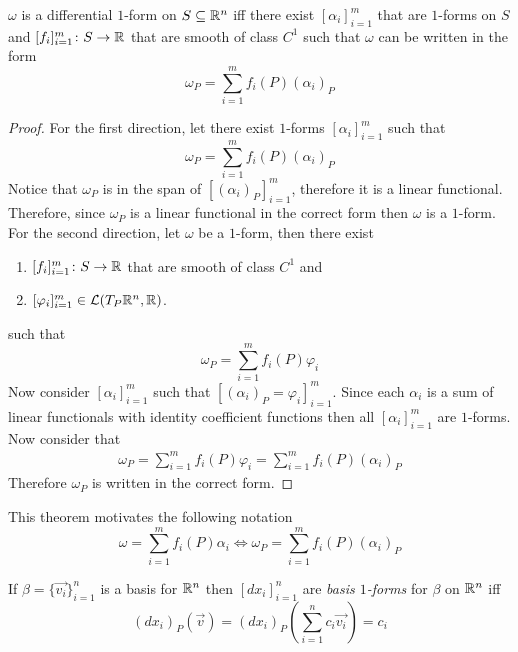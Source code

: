 \documentclass[notes]{subfiles}
\begin{document}
\begin{theorem} \label{forms_are_sum_of_forms}
    $\omega$ is a differential $1$-form on $S \subseteq \mathbb{R}^n$ iff there exist $[\alpha_i]_{i = 1}^m$ that are $1$-forms on $S$ and $[f_i]_{i = 1}^m\colon S \to \mathbb{R}$ that are smooth of class $C^1$ such that $\omega$ can be written in the form
    \[
        \omega_P = \sum_{i = 1}^m f_i(P)(\alpha_i)_P
    \]
\end{theorem}
\begin{proof}
    For the first direction, let there exist $1$-forms $[\alpha_i]_{i = 1}^m$ such that
    \[
        \omega_P = \sum_{i = 1}^m f_i(P)(\alpha_i)_P
    \]
    Notice that $\omega_P$ is in the span of $[(\alpha_i)_P]_{i = 1}^m$, therefore it is a linear functional. Therefore, since $\omega_P$ is a linear functional in the correct form then $\omega$ is a $1$-form. \\
    For the second direction, let $\omega$ be a $1$-form, then there exist
    \begin{enumerate}[label = \arabic*)]
        \item $[f_i]_{i = 1}^m\colon S \to \mathbb{R}$ that are smooth of class $C^1$ and
        \item $[\varphi_i]_{i = 1}^m \in \mathcal{L}(T_P \mathbb{R}^n, \mathbb{R})$.
    \end{enumerate}
    such that
    \[
        \omega_P = \sum_{i = 1}^m f_i(P)\varphi_i
    \]
    Now consider $[\alpha_i]_{i = 1}^m$ such that $[(\alpha_i)_P = \varphi_i]_{i = 1}^m$. Since each $\alpha_i$ is a sum of linear functionals with identity coefficient functions then all $[\alpha_i]_{i = 1}^m$ are $1$-forms. Now consider that
    \begin{align*}
        \omega_P = \sum_{i = 1}^m f_i(P)\varphi_i = \sum_{i = 1}^m f_i(P)(\alpha_i)_P
    \end{align*}
    Therefore $\omega_P$ is written in the correct form.
\end{proof}

This theorem motivates the following notation
\[
    \omega = \sum_{i = 1}^m f_i(P)\alpha_i \iff \omega_P = \sum_{i = 1}^m f_i(P)(\alpha_i)_P
\]

\begin{definition}
    If $\beta = \{ \vec{v_i} \}_{i = 1}^n$ is a basis for $\mathbb{R}^n$ then $[dx_i]_{i = 1}^n$ are \textit{basis $1$-forms} for $\beta$ on $\mathbb{R}^n$ iff
    \[
        (dx_i)_P(\vec{v}) = (dx_i)_P\left( \sum_{i = 1}^n c_i\vec{v_i} \right) = c_i
    \]
\end{definition}
\end{document}

